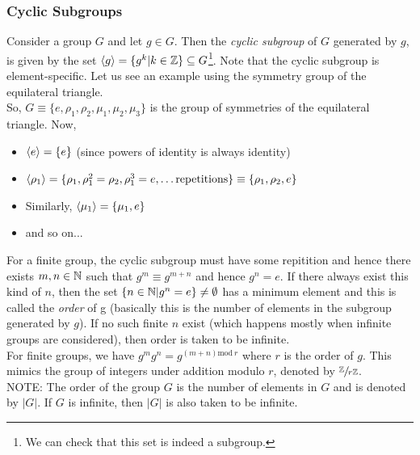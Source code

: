 \subsubsection{Cyclic Subgroups}
Consider a group $G$ and let $g\in G$. Then the \textit{cyclic subgroup} of $G$ generated by $g$, is given by the set $\left\langle g \right\rangle = \{g^k|k\in \mathbb{Z} \}\subseteq G$\footnote{We can check that this set is indeed a subgroup.}. Note that the cyclic subgroup is element-specific. Let us see an example using the symmetry group of the equilateral triangle.\\[0.2cm]
So, $G\equiv \{e,\rho_1, \rho_2, \mu_1, \mu_2, \mu_3\}$ is the group of symmetries of the equilateral triangle. Now,
\begin{itemize}
    \item $\left\langle e \right\rangle = \{e\}$ (since powers of identity is always identity)
    \item $\left\langle \rho_1 \right\rangle = \{\rho_1, \rho_1^2 = \rho_2, \rho_1^3 = e, \ldots \text{repetitions}\}\equiv \{\rho_1,\rho_2,e\}$ 
    \item Similarly, $\left\langle \mu_1 \right\rangle = \{\mu_1, e\}$
    \item and so on...
\end{itemize}
For a finite group, the cyclic subgroup must have some repitition and hence there exists $m,n\in \mathbb{N}$ such that $g^m \equiv g^{m+n}$ and hence $g^n = e$. If there always exist this kind of $n$, then the set $\{n\in \mathbb{N}|g^n=e\}\neq \emptyset$ has a minimum element and this is called the \textit{order} of g (basically this is the number of elements in the subgroup generated by $g$). If no such finite $n$ exist (which happens mostly when infinite groups are considered), then order is taken to be infinite.\\[0.2cm]
For finite groups, we have $g^m g^n = g^{(m+n) \mathrm{mod} \ r}$ where $r$ is the order of $g$. This mimics the group of integers under addition modulo $r$, denoted by $\sfrac{\mathbb{Z}}{r\mathbb{Z}}$. \\[0.2cm]
NOTE: The order of the group $G$ is the number of elements in $G$ and is denoted by $|G|$. If $G$ is infinite, then $|G|$ is also taken to be infinite.
